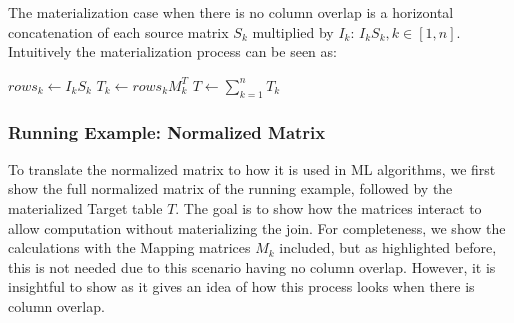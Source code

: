 The materialization case when there is no column overlap is a horizontal concatenation of each source matrix $S_k$ multiplied by $I_k$: $I_k S_k, k \in [1,n]$. Intuitively the materialization process can be seen as:
\begin{algorithmic}
   
  \State $rows_k \gets I_k S_k$ 
  \State $T_k \gets rows_k M^T_k$ 
  \EndFor
  \State $T \gets \sum_{k=1}^{n} T_k$ 
\end{algorithmic}

\subsubsection{Running Example: Normalized Matrix}
\label{subsubsec:2-fac-ml-example}
To translate the normalized matrix to how it is used in ML algorithms, we first show the full normalized matrix of the running example, followed by the materialized Target table $T$. The goal is to show how the matrices interact to allow computation without materializing the join. For completeness, we show the calculations with the Mapping matrices $M_k$ included, but as highlighted before, this is not needed due to this scenario having no column overlap. However, it is insightful to show as it gives an idea of how this process looks when there is column overlap.
